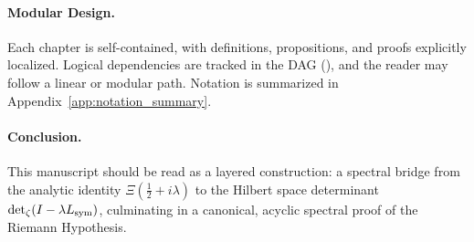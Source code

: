 \paragraph*{Modular Design.} Each chapter is self-contained, with definitions, propositions, and proofs explicitly localized. Logical dependencies are tracked in the DAG (), and the reader may follow a linear or modular path. Notation is summarized in Appendix~\ref{app:notation_summary}.

\paragraph*{Conclusion.} This manuscript should be read as a layered construction: a spectral bridge from the analytic identity \( \Xi(\tfrac{1}{2}+i\lambda) \) to the Hilbert space determinant \( \det\nolimits_{\zeta}(I - \lambda L_{\mathrm{sym}}) \), culminating in a canonical, acyclic spectral proof of the Riemann Hypothesis.
